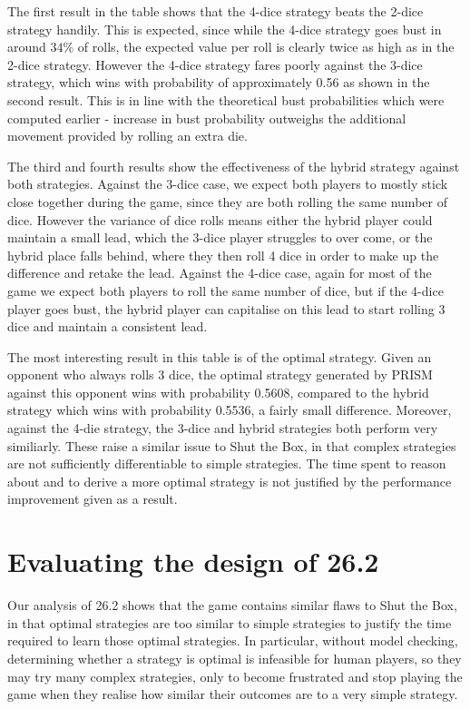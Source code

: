 The first result in the table shows that the 4-dice strategy beats the 2-dice strategy handily. This is expected, since while the 4-dice strategy goes bust in around $34\%$ of rolls, the expected value per roll is clearly twice as high as in the 2-dice strategy. However the 4-dice strategy fares poorly against the 3-dice strategy, which wins with probability of approximately 0.56 as shown in the second result. This is in line with the theoretical bust probabilities which were computed earlier - increase in bust probability outweighs the additional movement provided by rolling an extra die.

The third and fourth results show the effectiveness of the hybrid strategy against both strategies. Against the 3-dice case, we expect both players to mostly stick close together during the game, since they are both rolling the same number of dice. However the variance of dice rolls means either the hybrid player could maintain a small lead, which the 3-dice player struggles to over come, or the hybrid place falls behind, where they then roll 4 dice in order to make up the difference and retake the lead. Against the 4-dice case, again for most of the game we expect both players to roll the same number of dice, but if the 4-dice player goes bust, the hybrid player can capitalise on this lead to start rolling 3 dice and maintain a consistent lead.

The most interesting result in this table is of the optimal strategy. Given an opponent who always rolls 3 dice, the optimal strategy generated by PRISM against this opponent wins with probability 0.5608, compared to the hybrid strategy which wins with probability 0.5536, a fairly small difference. Moreover, against the 4-die strategy, the 3-dice and hybrid strategies both perform very similiarly. These raise a similar issue to Shut the Box, in that complex strategies are not sufficiently differentiable to simple strategies. The time spent to reason about and to derive a more optimal strategy is not justified by the performance improvement given as a result.

\section{Evaluating the design of 26.2}

Our analysis of 26.2 shows that the game contains similar flaws to Shut the Box, in that optimal strategies are too similar to simple strategies to justify the time required to learn those optimal strategies. In particular, without model checking, determining whether a strategy is optimal is infeasible for human players, so they may try many complex strategies, only to become frustrated and stop playing the game when they realise how similar their outcomes are to a very simple strategy.

